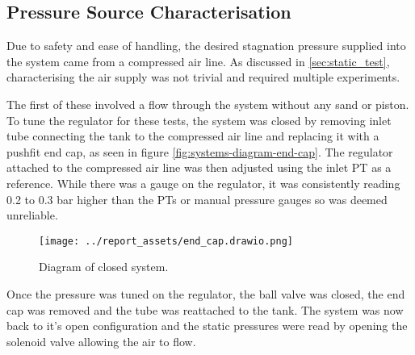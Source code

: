 
\subsection{Pressure Source Characterisation}
Due to safety and ease of handling, the desired stagnation pressure supplied into the system came from a compressed air line. As discussed in \autoref{sec:static_test}, characterising the air supply was not trivial and required multiple experiments. 

The first of these involved a flow through the system without any sand or piston. To tune the regulator for these tests, the system was closed by removing inlet tube connecting the tank to the compressed air line and replacing it with a pushfit end cap, as seen in figure \autoref{fig:systems-diagram-end-cap}. The regulator attached to the compressed air line was then adjusted using the inlet PT as a reference. While there was a gauge on the regulator, it was consistently reading 0.2 to 0.3 bar higher than the PTs or manual pressure gauges so was deemed unreliable. 
\begin{figure}[htbp]
    \centering
    \begin{minipage}{0.45\textwidth}
        \centering
        \texttt{[image: ../report\_assets/end\_cap.drawio.png]}
        \caption{Diagram of closed system.}\label{fig:systems-diagram-end-cap}
    \end{minipage}
\end{figure}

Once the pressure was tuned on the regulator, the ball valve was closed, the end cap was removed and the tube was reattached to the tank. The system was now back to it's open configuration and the static pressures were read by opening the solenoid valve allowing the air to flow.

